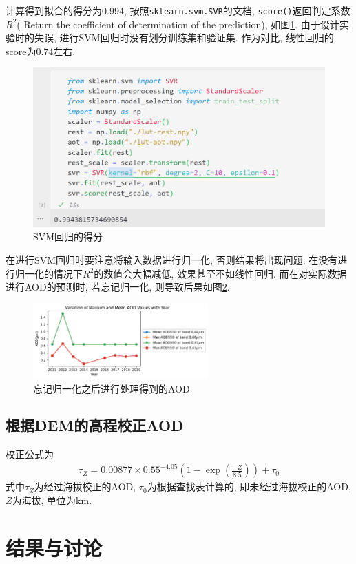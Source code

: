 \documentclass{ctexart}
\begin{document}
\begin{sloppypar}
计算得到拟合的得分为0.994, 按照\verb|sklearn.svm.SVR|的文档, \verb|score()|返回判定系数$R^2$(	
Return the coefficient of determination of the prediction), 如图\ref{score}. 由于设计实验时的失误, 进行SVM回归时没有划分训练集和验证集. 作为对比, 线性回归的score为0.74左右.
\begin{figure}[h]\centering
\includegraphics[width=.7\textwidth]{./src/score.png}
\caption{SVM回归的得分}\label{score}
\end{figure}

在进行SVM回归时要注意将输入数据进行归一化, 否则结果将出现问题. 在没有进行归一化的情况下$R^2$的数值会大幅减低, 效果甚至不如线性回归. 而在对实际数据进行AOD的预测时, 若忘记归一化, 则导致后果如图\ref{wrong}.
\begin{figure}[h]\centering
\includegraphics[width=0.6\textwidth]{./src/stat-wrong.pdf}
\caption{忘记归一化之后进行处理得到的AOD}\label{wrong}
\end{figure}

\subsection{根据DEM的高程校正AOD}
校正公式为
\begin{align}
\tau_Z=0.00877\times 0.55^{-4.05}\left(1-\exp\left(\frac{-Z}{8.5}\right)\right)+\tau_0
\end{align}
式中$\tau_Z$为经过海拔校正的AOD, $\tau_0$为根据查找表计算的, 即未经过海拔校正的AOD, $Z$为海拔, 单位为km.
\section{结果与讨论}

\end{sloppypar}
\end{document}
